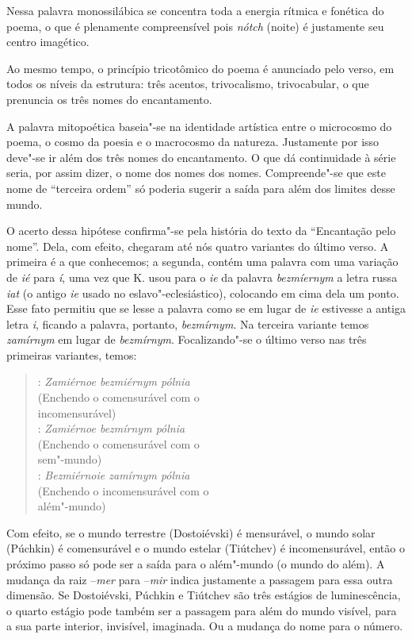 {Nessa palavra monossilábica se concentra toda a energia rítmica e
fonética do poema, o que é plenamente compreensível pois \emph{nótch}
(noite) é justamente seu centro imagético.

Ao mesmo tempo, o princípio tricotômico do poema é anunciado pelo 
verso, em todos os níveis da estrutura: três acentos, trivocalismo,
trivocabular, o que prenuncia os três nomes do encantamento.

A palavra mitopoética baseia"-se na identidade artística entre o
microcosmo do poema, o cosmo da poesia e o macrocosmo da natureza.
Justamente por isso deve"-se ir além dos três nomes do encantamento. O
que dá continuidade à série seria, por assim dizer, o nome dos nomes dos
nomes. Compreende"-se que este nome de ``terceira ordem'' só poderia
sugerir a saída para além dos limites desse mundo.

O acerto dessa hipótese confirma"-se pela história do texto da
``Encantação pelo nome''. Dela, com efeito, chegaram até nós quatro
variantes do último verso. A primeira é a que conhecemos; a segunda,
contém uma palavra com uma variação de \emph{ié} para \emph{í}, uma vez
que K. usou para o \emph{ie} da palavra \emph{bezm\emph{íe}rnym} a letra
russa \emph{iat} (o antigo \emph{ie} usado no eslavo"-eclesiástico),
colocando em cima dela um ponto. Esse fato permitiu que se lesse a
palavra como se em lugar de \emph{ie} estivesse a antiga letra
\emph{i}, ficando a palavra, portanto, \emph{bezmírnym}. Na terceira
variante temos \emph{zamírnym} em lugar de \emph{bezmírnym}.
Focalizando"-se o último verso nas três primeiras variantes, temos:

\begin{verse}
: \emph{Zamiérnoe bezmiérnym pólnia} \\
(Enchendo o comensurável com o \\
incomensurável) \\[8pt]

: \emph{Zamiérnoe bezmírnym pólnia} \\
(Enchendo o comensurável com o \\
sem"-mundo) \\[8pt]

: \emph{Bezmiérnoie zamírnym pólnia} \\
(Enchendo o incomensurável com o \\
além"-mundo)
\end{verse}

Com efeito, se o mundo terrestre (Dostoiévski) é mensurável, o mundo
solar (Púchkin) é comensurável e o mundo estelar (Tiútchev) é
incomensurável, então o próximo passo só pode ser a saída para o
além"-mundo (o mundo do além). A mudança da raiz --\emph{mer} para
--\emph{mir} indica justamente a passagem para essa outra dimensão. Se
Dostoiévski, Púchkin e Tiútchev são três estágios de luminescência, o
quarto estágio pode também ser a passagem para além do mundo visível,
para a sua parte interior, invisível, imaginada. Ou a mudança do nome
para o número.

}
